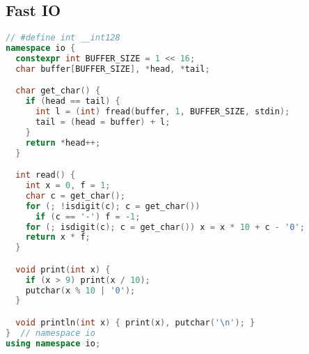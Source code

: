 \subsection{Fast IO}
\begin{lstlisting}[language=C++]
// #define int __int128
namespace io {
  constexpr int BUFFER_SIZE = 1 << 16;
  char buffer[BUFFER_SIZE], *head, *tail;

  char get_char() {
    if (head == tail) {
      int l = (int) fread(buffer, 1, BUFFER_SIZE, stdin);
      tail = (head = buffer) + l;
    }
    return *head++;
  }

  int read() {
    int x = 0, f = 1;
    char c = get_char();
    for (; !isdigit(c); c = get_char())
      if (c == '-') f = -1;
    for (; isdigit(c); c = get_char()) x = x * 10 + c - '0';
    return x * f;
  }

  void print(int x) {
    if (x > 9) print(x / 10);
    putchar(x % 10 | '0');
  }

  void println(int x) { print(x), putchar('\n'); }
}  // namespace io
using namespace io;

\end{lstlisting}

